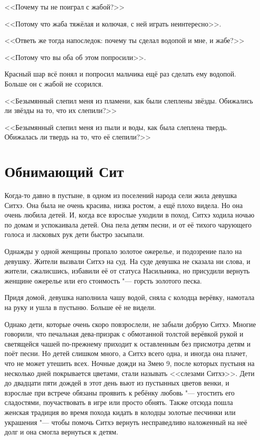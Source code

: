 <<Почему ты не поиграл с жабой?>>

<<Потому что жаба тяжёлая и колючая, с ней играть неинтересно>>.

<<Ответь же тогда напоследок: почему ты сделал водопой и мне, и жабе?>>

<<Потому что вы оба об этом попросили>>.

Красный шар всё понял и попросил мальчика ещё раз сделать ему водопой.
Больше он с жабой не ссорился.

\spacing

<<Безымянный слепил меня из пламени, как были слеплены звёзды.
Обижались ли звёзды на то, что их слепили?>>

<<Безымянный слепил меня из пыли и воды, как была слеплена твердь.
Обижалась ли твердь на то, что её слепили?>>

\section{Обнимающий Сит}

Когда-то давно в пустыне, в одном из поселений народа сели жила девушка Ситхэ.
Она была не очень красива, низка ростом, а ещё плохо видела.
Но она очень любила детей.
И, когда все взрослые уходили в поход, Ситхэ ходила ночью по домам и успокаивала детей.
Она пела детям песни, и от её тихого чарующего голоса и ласковых рук дети быстро засыпали.

Однажды у одной женщины пропало золотое ожерелье, и подозрение пало на девушку.
Жители вызвали Ситхэ на суд.
На суде девушка не сказала ни слова, и жители, сжалисшись, избавили её от статуса Насильника, но присудили вернуть женщине ожерелье или его стоимость "--- горсть золотого песка.

Придя домой, девушка наполнила чашу водой, сняла с колодца верёвку, намотала на руку и ушла в пустыню.
Больше её не видели.

Однако дети, которые очень скоро повзрослели, не забыли добрую Ситхэ.
Многие говорили, что печальная дева-призрак с обмотанной толстой верёвкой рукой и светящейся чашей по-прежнему приходит к оставленным без присмотра детям и поёт песни.
Но детей слишком много, а Ситхэ всего одна, и иногда она плачет, что не может утешить всех.
Ночные дожди на Змею 9, после которых пустыня на несколько дней покрывается цветами, стали называть <<слезами Ситхэ>>.
Дети до двадцати пяти дождей в этот день вьют из пустынных цветов венки, и взрослые при встрече обязаны проявить к ребёнку любовь "--- угостить его сладостями, поучаствовать в игре или просто обнять.
Также отсюда пошла женская традиция во время похода кидать в колодцы золотые песчинки или украшения "--- чтобы помочь Ситхэ вернуть несправедливо наложенный на неё долг и она смогла вернуться к детям.

